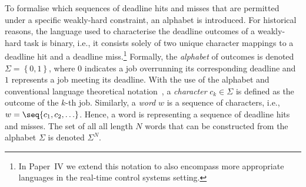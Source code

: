 To formalise which sequences of deadline hits and misses that are permitted under a specific weakly-hard constraint, an alphabet is introduced.
For historical reasons, the language used to characterise the deadline outcomes of a weakly-hard task is binary, i.e., it consists solely of two unique character mappings to a deadline hit and a deadline miss.\footnote{In Paper~IV we extend this notation to also encompass more appropriate languages in the real-time control systems setting.}
Formally, the \emph{alphabet} of outcomes is denoted $\Sigma = \left\{ 0, 1 \right\}$, where $0$ indicates a job overrunning its corresponding deadline and $1$ represents a job meeting its deadline.
With the use of the alphabet and conventional language theoretical notation~\cite{Hopcroft:2006}, a \emph{character} $c_k \in \Sigma$ is defined as the outcome of the $k$-th job.
Similarly, a \emph{word} $w$ is a sequence of characters, i.e., $w = \seq{c_1, c_2, \ldots}$.
Hence, a word is representing a sequence of deadline hits and misses.
The set of all all length $N$ words that can be constructed from the alphabet $\Sigma$ is denoted $\Sigma^N$.

